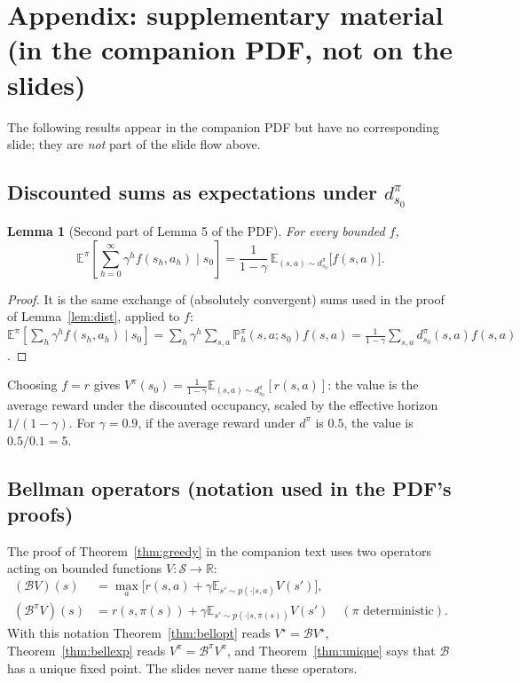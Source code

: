 \documentclass[11pt,a4paper]{article}
\newcommand{\E}{\mathbb{E}}
\newcommand{\PP}{\mathbb{P}}
\newcommand{\cS}{\mathcal{S}}
\theoremstyle{plain}
\newtheorem{lemma}[theorem]{Lemma}
\theoremstyle{definition}
\theoremstyle{remark}
\begin{document}
\appendix
\section{Appendix: supplementary material (in the companion PDF, not on the slides)}
The following results appear in the companion PDF but have no corresponding slide; they are \emph{not} part of the slide flow above.

\subsection{Discounted sums as expectations under \texorpdfstring{$d^\pi_{s_0}$}{d}}\label{app:identity}
\begin{lemma}[Second part of Lemma 5 of the PDF]
For every bounded $f$,
\[
  \E^\pi\!\left[\sum_{h=0}^\infty\gamma^hf(s_h,a_h)\;\Big|\;s_0\right]=\frac1{1-\gamma}\,\E_{(s,a)\sim d^\pi_{s_0}}\big[f(s,a)\big].
\]
\end{lemma}
\begin{proof}
It is the same exchange of (absolutely convergent) sums used in the proof of Lemma~\ref{lem:dist}, applied to $f$: $\E^\pi[\sum_h\gamma^hf(s_h,a_h)\mid s_0]=\sum_h\gamma^h\sum_{s,a}\PP^\pi_h(s,a;s_0)f(s,a)=\frac1{1-\gamma}\sum_{s,a}d^\pi_{s_0}(s,a)f(s,a)$.
\end{proof}
\begin{intuition}
Choosing $f=r$ gives $V^\pi(s_0)=\frac1{1-\gamma}\E_{(s,a)\sim d^\pi_{s_0}}[r(s,a)]$: the value is the average reward under the discounted occupancy, scaled by the effective horizon $1/(1-\gamma)$. For $\gamma=0.9$, if the average reward under $d^\pi$ is $0.5$, the value is $0.5/0.1=5$.
\end{intuition}

\subsection{Bellman operators (notation used in the PDF's proofs)}\label{app:ops}
The proof of Theorem~\ref{thm:greedy} in the companion text uses two operators acting on bounded functions $V:\cS\to\mathbb R$:
\begin{align*}
  (\mathcal BV)(s)&=\max_a\Big[r(s,a)+\gamma\E_{s'\sim p(\cdot|s,a)}V(s')\Big],\\
  (\mathcal B^{\pi}V)(s)&=r(s,\pi(s))+\gamma\E_{s'\sim p(\cdot|s,\pi(s))}V(s')\quad(\pi\text{ deterministic}).
\end{align*}
With this notation Theorem~\ref{thm:bellopt} reads $V^\star=\mathcal BV^\star$, Theorem~\ref{thm:bellexp} reads $V^\pi=\mathcal B^\pi V^\pi$, and Theorem~\ref{thm:unique} says that $\mathcal B$ has a unique fixed point. The slides never name these operators.
\end{document}
